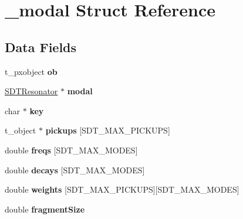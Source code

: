 \hypertarget{struct__modal}{}\section{\+\_\+modal Struct Reference}
\label{struct__modal}
\subsection*{Data Fields}
\begin{DoxyCompactItemize}
\item 
\hypertarget{struct__modal_a55b4380edb216f04a1c42b9095594963}{}t\+\_\+pxobject {\bfseries ob}\label{struct__modal_a55b4380edb216f04a1c42b9095594963}

\item 
\hypertarget{struct__modal_ac75d65ce5cebd1ddd6c3ce0491391718}{}\hyperlink{struct_s_d_t_resonator}{S\+D\+T\+Resonator} $\ast$ {\bfseries modal}\label{struct__modal_ac75d65ce5cebd1ddd6c3ce0491391718}

\item 
\hypertarget{struct__modal_a300a5cc1ad956ba66d9082e9e1945142}{}char $\ast$ {\bfseries key}\label{struct__modal_a300a5cc1ad956ba66d9082e9e1945142}

\item 
\hypertarget{struct__modal_aaad8972ca003b30937bd607d94989bae}{}t\+\_\+object $\ast$ {\bfseries pickups} \mbox{[}S\+D\+T\+\_\+\+M\+A\+X\+\_\+\+P\+I\+C\+K\+U\+P\+S\mbox{]}\label{struct__modal_aaad8972ca003b30937bd607d94989bae}

\item 
\hypertarget{struct__modal_ab6ba5c9e1b3f853d792680ad70526213}{}double {\bfseries freqs} \mbox{[}S\+D\+T\+\_\+\+M\+A\+X\+\_\+\+M\+O\+D\+E\+S\mbox{]}\label{struct__modal_ab6ba5c9e1b3f853d792680ad70526213}

\item 
\hypertarget{struct__modal_a5df5bb949c93b1be357d4fe8fb6e812f}{}double {\bfseries decays} \mbox{[}S\+D\+T\+\_\+\+M\+A\+X\+\_\+\+M\+O\+D\+E\+S\mbox{]}\label{struct__modal_a5df5bb949c93b1be357d4fe8fb6e812f}

\item 
\hypertarget{struct__modal_ad9092cf069291f4965d69b602fe5fcd2}{}double {\bfseries weights} \mbox{[}S\+D\+T\+\_\+\+M\+A\+X\+\_\+\+P\+I\+C\+K\+U\+P\+S\mbox{]}\mbox{[}S\+D\+T\+\_\+\+M\+A\+X\+\_\+\+M\+O\+D\+E\+S\mbox{]}\label{struct__modal_ad9092cf069291f4965d69b602fe5fcd2}

\item 
\hypertarget{struct__modal_a9d63554896a3857fbd74343d213f2351}{}double {\bfseries fragment\+Size}\label{struct__modal_a9d63554896a3857fbd74343d213f2351}


\end{DoxyCompactItemize}
